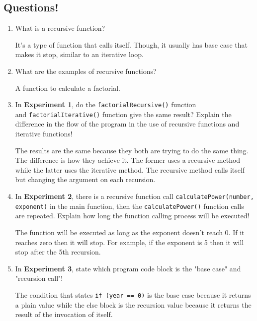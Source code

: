 \documentclass[12pt,titlepage]{article}
\begin{document}
\subsection*{Questions!}
\begin{enumerate}
    \item {
        What is a recursive function?

        It's a type of function that calls itself. Though, it usually has base case that makes it stop, similar to an iterative loop.
    }
    \item {
        What are the examples of recursive functions?

        A function to calculate a factorial.
    }
    \item {
        In \textbf{Experiment 1}, do the \texttt{factorialRecursive()} function \\and \texttt{factorialIterative()}
        function give the same result? Explain the difference in the flow of the program in the use of recursive functions and iterative functions!

        The results are the same because they both are trying to do the same thing. The difference is how they achieve it. The former uses a recursive method while the latter uses the iterative method.
        The recursive method calls itself but changing the argument on each recursion.
    }
    \item {
        In \textbf{Experiment 2}, there is a recursive function call \texttt{calculatePower(number, exponent)} in the main function,
        then the \texttt{calculatePower()} function calls are repeated. Explain how long the function calling process will be executed!

        The function will be executed as long as the exponent doesn't reach 0. If it reaches zero then it will stop. For example, if the exponent is 5 then it will stop after the 5th recursion.
    }
    \item {
        In \textbf{Experiment 3}, state which program code block is the "base case" and "recursion call"!

        The condition that states \texttt{if (year == 0)} is the base case because it returns a plain value while the else block is the recursion value
        because it returns the result of the invocation of itself.
    }
\end{enumerate}

\pagebreak
\end{document}
